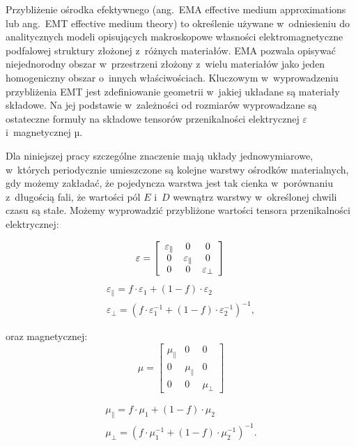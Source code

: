 \label{subart:effmedium}
Przybliżenie ośrodka efektywnego (ang.~EMA effective medium approximations lub ang.~EMT effective medium theory) to określenie używane w~odniesieniu do analitycznych modeli opisujących makroskopowe własności elektromagnetyczne podfalowej struktury złożonej z~różnych materiałów. EMA pozwala opisywać niejednorodny obszar w~przestrzeni złożony z~wielu materiałów jako jeden homogeniczny obszar o~innych właściwościach. Kluczowym w~wyprowadzeniu przybliżenia EMT jest zdefiniowanie geometrii w~jakiej układane są materiały składowe. Na jej podstawie w~zależności od rozmiarów wyprowadzane są ostateczne formuły na składowe tensorów przenikalności elektrycznej $\varepsilon$ i~magnetycznej µ.

Dla niniejszej pracy szczególne znaczenie mają układy jednowymiarowe, w~których periodycznie umieszczone są kolejne warstwy ośrodków materialnych, gdy możemy zakładać, że pojedyncza warstwa jest tak cienka w~porównaniu z~długością fali, że wartości pól $E$ i~$D$ wewnątrz warstwy w~określonej chwili czasu są stałe. Możemy wyprowadzić przybliżone wartości tensora przenikalności elektrycznej:

\[ \varepsilon= \left[ \begin{array}{ccc}
	\varepsilon_{\parallel} & 0 & 0 \\
	0 & \varepsilon_{\parallel} & 0 \\
	0 & 0 &  \varepsilon_{\perp} \end{array} \right] 
\\
\]
\begin{equation}
	\begin{gathered}
		\varepsilon_{\parallel}=f\cdot{\varepsilon_1}+(1-f)\cdot \varepsilon_2 \\ 
		\varepsilon_{\perp}=\left(f\cdot{\varepsilon_1^{-1}}+(1-f)\cdot \varepsilon_2^{-1}\right)^{-1},
	\end{gathered}
\label{eq:effmedium}
\end{equation}


oraz magnetycznej:
\[ \mu= \left[ \begin{array}{ccc}
					\mu_{\parallel} & 0 & 0 \\
					0 & \mu_{\parallel} & 0 \\
					0 & 0 &  \mu_{\perp} \end{array} \right]
\]

\begin{equation}
	\begin{gathered}
		\mu_{\parallel}=f\cdot{\mu_1}+(1-f)\cdot \mu_2 \\
		\mu_{\perp}=\left(f\cdot{\mu_1^{-1}}+(1-f)\cdot \mu_2^{-1}\right)^{-1}.
	\end{gathered}
\label{eq:effmedium-mu}
\end{equation}

